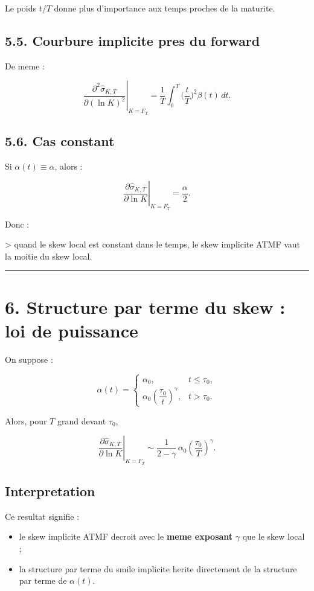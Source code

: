 \documentclass[11pt,a4paper]{article}
\begin{document}
Le poids \(t/T\) donne plus d'importance aux temps proches de la maturite.

\subsection{5.5. Courbure implicite pres du forward}

De meme :

\[
\boxed{
\left.\frac{\partial^2 \widehat{\sigma}_{K,T}}{\partial(\ln K)^2}\right|_{K=F_T}
=
\frac{1}{T}\int_0^T \Big(\frac{t}{T}\Big)^2\beta(t)\,dt.
}
\]

\subsection{5.6. Cas constant}

Si \(\alpha(t)\equiv\alpha\), alors :

\[
\left.\frac{\partial \widehat{\sigma}_{K,T}}{\partial\ln K}\right|_{K=F_T}
=
\frac{\alpha}{2}.
\]

Donc :

> quand le skew local est constant dans le temps, le skew implicite ATMF vaut la moitie du skew local.

\bigskip\hrule\bigskip

\section{6. Structure par terme du skew : loi de puissance}

On suppose :

\[
\alpha(t)=
\begin{cases}
\alpha_0, & t\le \tau_0,\\[0.3em]
\alpha_0\left(\dfrac{\tau_0}{t}\right)^\gamma, & t>\tau_0.
\end{cases}
\]

Alors, pour \(T\) grand devant \(\tau_0\),

\[
\left.\frac{\partial \widehat{\sigma}_{K,T}}{\partial\ln K}\right|_{K=F_T}
\sim
\frac{1}{2-\gamma}\,
\alpha_0\left(\frac{\tau_0}{T}\right)^\gamma.
\]

\subsection{Interpretation}

Ce resultat signifie :

\begin{itemize}
\item le skew implicite ATMF decroit avec le \textbf{meme exposant} \(\gamma\) que le skew local ;
\item la structure par terme du smile implicite herite directement de la structure par terme de \(\alpha(t)\).
\end{itemize}
\end{document}
